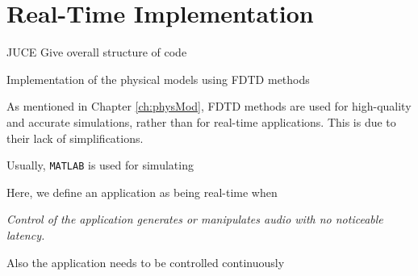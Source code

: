 \chapter{Real-Time Implementation}
JUCE
Give overall structure of code


Implementation of the physical models
using FDTD methods

As mentioned in Chapter \ref{ch:physMod}, FDTD methods are used for high-quality and accurate simulations, rather than for real-time applications. This is due to their lack of simplifications.

Usually, \texttt{MATLAB} is used for simulating 

Here, we define an application as being real-time when
\begin{center}\it
    Control of the application generates or manipulates audio with no noticeable latency.
\end{center}



Also the application needs to be controlled continuously